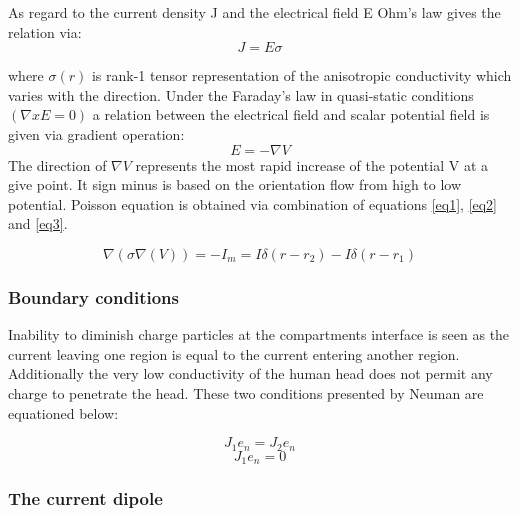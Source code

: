As regard to the current density J and the electrical field E Ohm's law gives the relation via: 
\begin{equation}\label{eq2}
   J=E\sigma
\end{equation}

where $\sigma(r)$ is rank-1 tensor representation of the anisotropic conductivity which varies with the direction. Under the Faraday's law  in quasi-static conditions $(\nabla xE=0)$ a relation between the electrical field and scalar potential field is given via gradient operation:
\begin{equation}\label{eq3}
E=-\nabla V   
\end{equation}
The direction of $\nabla V$ represents the most rapid increase of the potential V at a give point. It sign  minus is based on the orientation flow from high to low potential. Poisson equation is obtained via combination of equations \ref{eq1}, \ref{eq2} and \ref{eq3}.

\begin{equation}\label{eq4}
\nabla (\sigma \nabla(V))=-I_{m}=I\delta(r-r_{2})-I\delta(r-r_{1})
\end{equation}

\subsubsection{Boundary conditions}

Inability to diminish charge particles at the compartments interface is seen as the current leaving one region is equal to the current entering another region. Additionally the very low conductivity of the human head does not permit any charge to penetrate the head. These two conditions presented by Neuman are equationed below:

\begin{figure}[!htbp]
%
\centering
\begin{equation}
    J_{1}e_{n}=J_{2}e_{n}
\end{equation}
\endminipage\hfill
{}%
\centering
\begin{equation}
    J_{1}e_{n}=0
\end{equation}
\endminipage\hfill
\end{figure}

\subsubsection{The current dipole}

